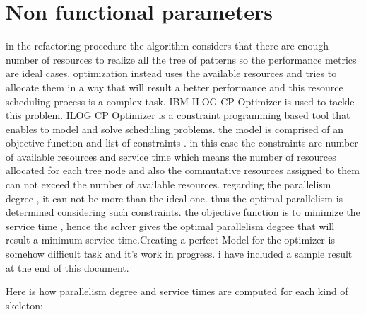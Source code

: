 \documentclass[12pt]{report}
\begin{document}
\section{Non functional parameters}
in the refactoring procedure the algorithm considers that there are enough number of resources to realize all the tree of patterns so the performance metrics are ideal cases. optimization instead uses the available resources and tries to allocate them in a way that will result a better performance and this resource scheduling process is a complex task. IBM ILOG CP Optimizer is used to tackle this problem. ILOG CP Optimizer is a constraint programming based tool that enables to model and solve scheduling problems. 
the model is comprised of an objective function and list of constraints . in this case the constraints are number of available resources and service time which means the number of resources allocated for each tree node and also the commutative resources assigned to them can not exceed the number of available resources. regarding the parallelism degree , it can not be more than the ideal one. thus the optimal parallelism is determined considering such constraints. the objective function is to minimize the service time , hence the solver gives the optimal parallelism degree that will result a minimum service time.Creating a 
perfect Model for the optimizer is somehow difficult task and it's work in progress. i have included a sample result at the end of this document. 


Here is how  parallelism degree and service times are computed for each kind of skeleton:
\end{document}
